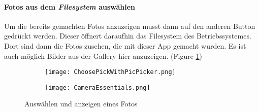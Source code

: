 \paragraph{Fotos aus dem \textit{Filesystem} auswählen}
 Um die bereits gemachten Fotos anzuzeigen musst dann auf den anderen Button gedrückt werden.
 Dieser öffnert daraufhin das Filesystem des Betriebssystemes. Dort sind dann die Fotos zusehen, die mit dieser App gemacht wurden.
 Es ist auch möglich Bilder aus der Gallery hier anzuzeigen. (Figure \ref{fig:TakePicFromPicker})

 \begin{figure}[h!]
    \centering
    \begin{subfigure}[b]{0.4\linewidth}
        \texttt{[image: ChoosePickWithPicPicker.png]}
      \end{subfigure}
      \begin{subfigure}[b]{0.4\linewidth}
        \texttt{[image: CameraEssentials.png]}
      \end{subfigure}
    \caption{Auswählen und anzeigen eines Fotos}
    \label{fig:TakePicFromPicker}
\end{figure}



